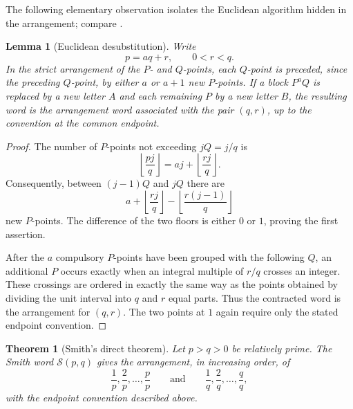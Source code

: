 \documentclass{book}
\newtheorem{lemma}[definition]{Lemma}
\newtheorem{theorem}[definition]{Theorem}
\begin{document}
The following elementary observation isolates the Euclidean algorithm hidden
in the arrangement; compare \cite[Arts.~1--10]{Smith1876}.

\begin{lemma}[Euclidean desubstitution]\label{lem:SmithDesubstitution}
  Write
  \[
    p=aq+r,\qquad 0<r<q.
  \]
  In the strict arrangement of the \(P\)- and \(Q\)-points, each \(Q\)-point
  is preceded, since the preceding \(Q\)-point, by either \(a\) or \(a+1\)
  new \(P\)-points. If a block \(P^aQ\) is replaced by a new letter \(A\)
  and each remaining \(P\) by a new letter \(B\), the resulting word is the
  arrangement word associated with the pair \((q,r)\), up to the convention
  at the common endpoint.
\end{lemma}

\begin{proof}
  The number of \(P\)-points not exceeding \(jQ=j/q\) is
  \[
    \left\lfloor\frac{pj}{q}\right\rfloor
    =aj+\left\lfloor\frac{rj}{q}\right\rfloor.
  \]
  Consequently, between \((j-1)Q\) and \(jQ\) there are
  \[
    a+
    \left\lfloor\frac{rj}{q}\right\rfloor
    -\left\lfloor\frac{r(j-1)}{q}\right\rfloor
  \]
  new \(P\)-points. The difference of the two floors is either \(0\) or
  \(1\), proving the first assertion.

  After the \(a\) compulsory \(P\)-points have been grouped with the
  following \(Q\), an additional \(P\) occurs exactly when an integral
  multiple of \(r/q\) crosses an integer. These crossings are ordered in
  exactly the same way as the points obtained by dividing the unit interval
  into \(q\) and \(r\) equal parts. Thus the contracted word is the
  arrangement for \((q,r)\). The two points at \(1\) again require only the
  stated endpoint convention.
\end{proof}

\begin{theorem}[Smith's direct theorem]\label{thm:SmithDirect}
  Let \(p>q>0\) be relatively prime. The Smith word
  \(\mathcal S(p,q)\) gives the arrangement, in increasing order, of
  \[
    \frac1p,\frac2p,\ldots,\frac pp
    \qquad\text{and}\qquad
    \frac1q,\frac2q,\ldots,\frac qq,
  \]
  with the endpoint convention described above.
\end{theorem}
\end{document}
